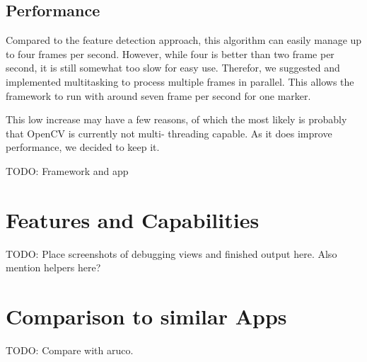 \subsection{Performance}
\label{performance}

Compared to the feature detection approach, this algorithm can easily manage up to four frames per second.
However, while four is better than two frame per second, it is still somewhat too slow for easy use.
Therefor, we suggested and implemented multitasking to process multiple frames in parallel.
This allows the framework to run with around seven frame per second for one marker.

This low increase may have a few reasons, of which the most likely is probably that OpenCV is currently not multi-
threading capable.
As it does improve performance, we decided to keep it.

TODO: Framework and app

\section{Features and Capabilities}

TODO: Place screenshots of debugging views and finished output here.
Also mention helpers here?

\section{Comparison to similar Apps}

TODO: Compare with aruco.
